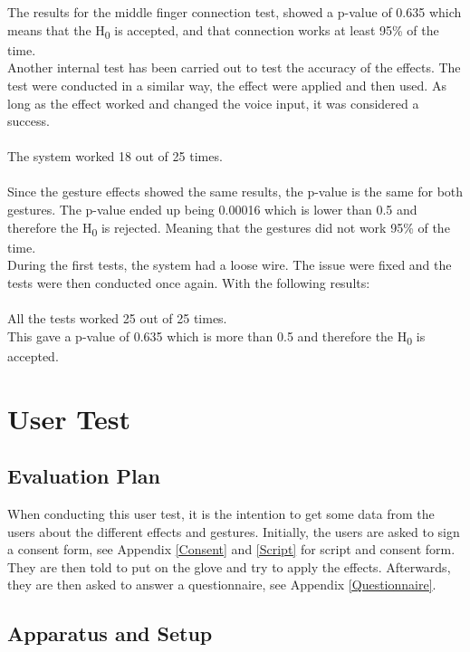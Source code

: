 The results for the middle finger connection test, showed a p-value of 0.635 which means that the H\textsubscript{0} is accepted,
and that connection works at least 95\% of the time. \\

Another internal test has been carried out to test the accuracy of the effects. The test were conducted in a similar way, the effect were applied and then used. 
As long as the effect worked and changed the voice input, it was considered a success. \\\\
The system worked 18 out of 25 times. \\\\

Since the gesture effects showed the same results, the p-value is the same for both gestures. 
The p-value ended up being 0.00016 which is lower than 0.5 and therefore the H\textsubscript{0} is rejected. 
Meaning that the gestures did not work 95\% of the time. \\

During the first tests, the system had a loose wire. The issue were fixed and the tests were then conducted once again. With the following results:\\\\
All the tests worked 25 out of 25 times. \\
This gave a p-value of 0.635 which is more than 0.5 and therefore the H\textsubscript{0} is accepted. 

\section{User Test}


\subsection{Evaluation Plan}
When conducting this user test, it is the intention to get some data from the users about the different effects and gestures. 
Initially, the users are asked to sign a consent form, see Appendix \ref{Consent} and \ref{Script} for script and consent form. They are then told to put on the glove and try to apply the effects. Afterwards, they are then asked to answer a questionnaire, see Appendix \ref{Questionnaire}. 

\subsection{Apparatus and Setup}

